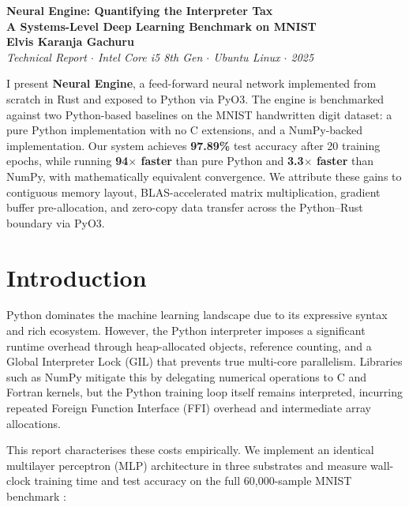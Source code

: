\documentclass[11pt]{article}
\renewenvironment{abstract}
 {\small
  \begin{center}
  \bfseries \abstractname\vspace{-.5em}\vspace{0pt}
  \end{center}
  \list{}{
    \setlength{\leftmargin}{0.5in}%
    \setlength{\rightmargin}{\leftmargin}%
  }%
  \item\relax}
 {\endlist}
\begin{document}
\begin{center}
  {\LARGE\bfseries Neural Engine: Quantifying the Interpreter Tax\\[4pt]
  \large A Systems-Level Deep Learning Benchmark on MNIST}\\[12pt]
  {\normalsize\textbf{Elvis Karanja Gachuru}}\\[4pt]
  {\small\textit{Technical Report $\cdot$ Intel Core i5 8th Gen $\cdot$ Ubuntu Linux $\cdot$ 2025}}\\[16pt]
\end{center}

\begin{abstract}
I present \textbf{Neural Engine}, a feed-forward neural network implemented from scratch in Rust and exposed to Python via PyO3. The engine is benchmarked against two Python-based baselines on the MNIST handwritten digit dataset: a pure Python implementation with no C extensions, and a NumPy-backed implementation. Our system achieves \textbf{97.89\%} test accuracy after 20 training epochs, while running \textbf{94$\times$ faster} than pure Python and \textbf{3.3$\times$ faster} than NumPy, with mathematically equivalent convergence. We attribute these gains to contiguous memory layout, BLAS-accelerated matrix multiplication, gradient buffer pre-allocation, and zero-copy data transfer across the Python--Rust boundary via PyO3.
\end{abstract}

\vspace{14pt}

\section{Introduction}

Python dominates the machine learning landscape due to its expressive syntax and rich ecosystem. However, the Python interpreter imposes a significant runtime overhead through heap-allocated objects, reference counting, and a Global Interpreter Lock (GIL) that prevents true multi-core parallelism. Libraries such as NumPy mitigate this by delegating numerical operations to C and Fortran kernels, but the Python training loop itself remains interpreted, incurring repeated Foreign Function Interface (FFI) overhead and intermediate array allocations.

This report characterises these costs empirically. We implement an identical multilayer perceptron (MLP) architecture in three substrates and measure wall-clock training time and test accuracy on the full 60{,}000-sample MNIST benchmark \cite{lecun1998}:
\end{document}
